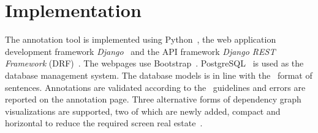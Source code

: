 \section{Implementation}
\label{sec:implementation}


The annotation tool is implemented using Python~\cite{python}, the web application development framework \textit{Django}~\cite{django} and the API framework \textit{Django REST Framework} (DRF)~\cite{drf}. The webpages use Bootstrap~\cite{bootstrap}.
PostgreSQL~\cite{psql} is used as the database management system.
The database models is in line with the \ud\ format of sentences.
Annotations are validated according to the \ud\ guidelines and errors are reported on the annotation page.
Three alternative forms of dependency graph visualizations are supported, two of which are newly added, compact and horizontal to reduce the required screen real estate~\cite{spacy,spyssalo}.

